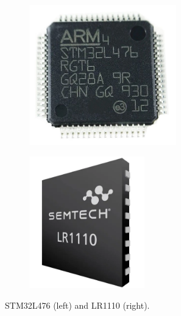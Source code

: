 \begin{figure}[H]
    \centering
    \begin{subfigure}{.45\textwidth}
      \centering
      \includegraphics[width=0.7\textwidth]{figures/STM32L476.jpg}
      \label{fig:stm32l476}
    \end{subfigure}%
    \begin{subfigure}{.45\textwidth}
      \centering
      \includegraphics[width=0.55\textwidth]{figures/LR1110.png}
      \label{fig:lr1110}
    \end{subfigure}
    \caption{STM32L476 (left) and LR1110 (right).}
    \label{fig:chips}
\end{figure}

